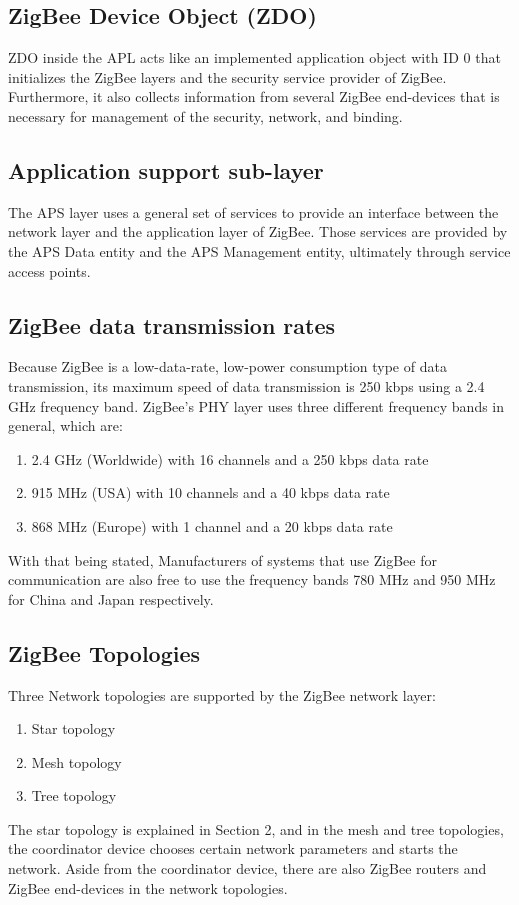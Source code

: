 \documentclass[conference]{IEEEtran}
\begin{document}
\subsection{ZigBee Device Object (ZDO)}
ZDO inside the APL acts like an implemented application object with ID 0 that initializes the ZigBee layers and the security service provider of ZigBee. Furthermore, it also collects information from several ZigBee end-devices that is necessary for management of the security, network, and binding\cite{DrahtlosZigbee}.

\subsection{Application support sub-layer}
The APS layer uses a general set of services to provide an interface between the network layer and the application layer of ZigBee. Those services are provided by the APS Data entity and the APS Management entity, ultimately through service access points\cite{CSAZigBeeSpecs}.\\

\subsection{ZigBee data transmission rates}

Because ZigBee is a low-data-rate, low-power consumption type of data transmission, its maximum speed of data transmission is 250 kbps using a 2.4 GHz frequency band. ZigBee's PHY layer uses three different frequency bands in general, which are\cite{CurrentStatusZigbee}:\\

\begin{enumerate}
    \item 2.4 GHz (Worldwide) with 16 channels and a 250 kbps data rate
    \item 915 MHz (USA) with 10 channels and a 40 kbps data rate
    \item 868 MHz (Europe) with 1 channel and a 20 kbps data rate
\end{enumerate}
With that being stated, Manufacturers of systems that use ZigBee for communication are also free to use the frequency bands 780 MHz and 950 MHz for China and Japan respectively\cite{DrahtlosZigbee}.

\subsection{ZigBee Topologies}
Three Network topologies are supported by the ZigBee network layer:
\begin{enumerate}
    \item Star topology
    \item Mesh topology
    \item Tree topology
\end{enumerate}
The star topology is explained in Section 2, and in the mesh and tree topologies, the coordinator device chooses certain network parameters and starts the network\cite{CSAZigBeeSpecs}. Aside from the coordinator device, there are also ZigBee routers and ZigBee end-devices in the network topologies\cite{DrahtlosZigbee}.
\end{document}
